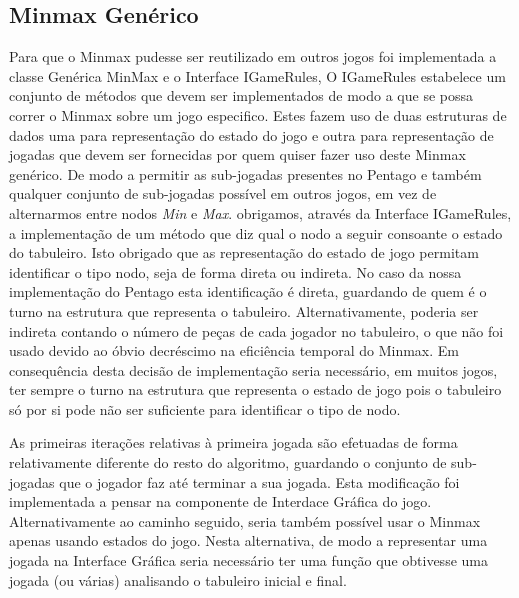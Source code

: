 \subsection{Minmax Genérico}

Para que o Minmax pudesse ser reutilizado em outros jogos foi implementada a classe Genérica MinMax e o Interface IGameRules, O IGameRules estabelece um conjunto de métodos que devem ser implementados de modo a que se possa correr o Minmax sobre um jogo especifico.%
Estes fazem uso de duas estruturas de dados uma para representação do estado do jogo e outra para representação de jogadas que devem ser fornecidas por quem quiser fazer uso deste Minmax genérico. 
\label{subjogadas_estrutura}
De modo a permitir as sub-jogadas presentes no Pentago e também qualquer conjunto de sub-jogadas possível em outros jogos, em vez de alternarmos entre nodos \emph{Min} e \emph{Max}. obrigamos, através da Interface IGameRules, a implementação de um método que diz qual o nodo a seguir consoante o estado do tabuleiro. Isto obrigado que as representação do estado de jogo permitam identificar o tipo nodo, seja de forma direta ou indireta. No caso da nossa implementação do Pentago esta identificação é direta, guardando de quem é o turno na estrutura que representa o tabuleiro. Alternativamente, poderia ser indireta contando o número de peças de cada jogador no tabuleiro, o que não foi usado devido ao óbvio decréscimo na eficiência temporal do Minmax. Em consequência desta decisão de implementação seria necessário, em muitos jogos, ter sempre o turno na estrutura que representa o estado de jogo pois o tabuleiro só por si pode não ser suficiente para identificar o tipo de nodo.

As primeiras iteraç\~oes relativas à primeira jogada são efetuadas de forma relativamente diferente do resto do algoritmo, guardando o conjunto de sub-jogadas que o jogador faz até terminar a sua jogada. Esta modificação foi implementada a pensar na componente de Interdace Gráfica do jogo.
Alternativamente ao caminho seguido, seria também possível usar o Minmax apenas usando estados do jogo. Nesta alternativa, de modo a representar uma jogada na Interface Gráfica seria necessário ter uma função que obtivesse uma jogada (ou várias) analisando o tabuleiro inicial e final. 

